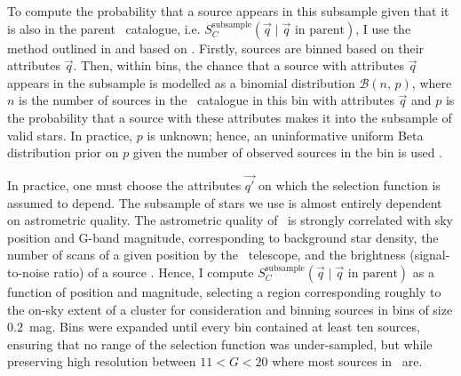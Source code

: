 To compute the probability that a source appears in this subsample given that it is also in the parent \gaia\ catalogue, i.e. $S_C^\text{subsample}(\vec{q} \mid \vec{q}\text{ in parent})$, I use the method outlined in \cite{castro-ginard_estimating_selection_2023} and based on \cite{rix_selection_functions_2021}. Firstly, sources are binned based on their attributes $\vec{q}$. Then, within bins, the chance that a source with attributes $\vec{q}$ appears in the subsample is modelled as a binomial distribution $\mathcal{B}(n,\,p)$, where $n$ is the number of sources in the \gaia\ catalogue in this bin with attributes $\vec{q}$ and $p$ is the probability that a source with these attributes makes it into the subsample of valid stars. In practice, $p$ is unknown; hence, an uninformative uniform Beta distribution prior on $p$ given the number of observed sources in the bin is used \citep[for full methodology, see][]{castro-ginard_estimating_selection_2023}.

In practice, one must choose the attributes $\vec{q'}$ on which the selection function is assumed to depend. The subsample of stars we use is almost entirely dependent on astrometric quality. The astrometric quality of \gaia\ is strongly correlated with sky position and G-band magnitude, corresponding to background star density, the number of scans of a given position by the \gaia\ telescope, and the brightness (signal-to-noise ratio) of a source \citep{lindegren_gaia_2021}. Hence, I compute $S_C^\text{subsample}(\vec{q} \mid \vec{q}\text{ in parent})$ as a function of position and magnitude, selecting a region corresponding roughly to the on-sky extent of a cluster for consideration and binning sources in bins of size $0.2$~mag. Bins were expanded until every bin contained at least ten sources, ensuring that no range of the selection function was under-sampled, but while preserving high resolution between $11 < G < 20$ where most sources in \gaia\ are.

